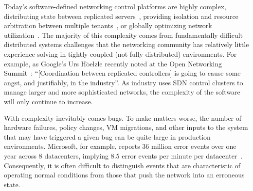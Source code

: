 
Today's software-defined networking control platforms are highly complex,
distributing state between replicated
servers~\cite{floodlight},
providing isolation and resource arbitration between multiple
tenants~\cite{Casado:2010:VNF:1921151.1921162}, or
globally optimizing network utilization~\cite{urs_keynote}.
The majority of this complexity comes from
fundamentally difficult distributed systems challenges that the networking community has
relatively little experience
solving in tightly-coupled (not fully distributed) environments.
For example, as Google's Urs H$\ddot{\mathrm{o}}$elzle recently
noted at the Open Networking Summit~\cite{urs_keynote}: ``[Coordination between replicated controllers] is going to
cause some angst, and justifiably, in the industry''. As industry uses SDN
control clusters to manage larger and more sophisticated networks, the
complexity of the software will only continue to increase.

With complexity inevitably comes
bugs. To make matters worse, the number of hardware failures,
policy changes, VM migrations, and other inputs to the system that may have
triggered a given bug can be quite large in production environments. Microsoft,
for example, reports 36 million error events over one year across 8
datacenters, implying 8.5 error events per minute per
datacenter~\cite{Greenberg:2009:VSF:1592568.1592576}.
Consequently, it is often difficult to distinguish events that are
characteristic of operating normal
conditions from those that push the network into an erroneous state.

